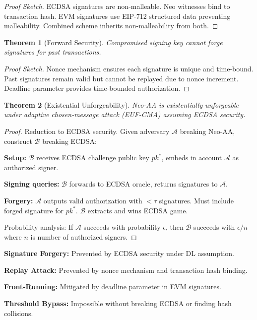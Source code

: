 \documentclass[10pt,twocolumn]{article}
\newtheorem{theorem}{Theorem}
\begin{document}
\begin{proof}[Proof Sketch]
ECDSA signatures are non-malleable. Neo witnesses bind to transaction hash. EVM signatures use EIP-712 structured data preventing malleability. Combined scheme inherits non-malleability from both.
\end{proof}

\begin{theorem}[Forward Security]
Compromised signing key cannot forge signatures for past transactions.
\end{theorem}

\begin{proof}[Proof Sketch]
Nonce mechanism ensures each signature is unique and time-bound. Past signatures remain valid but cannot be replayed due to nonce increment. Deadline parameter provides time-bounded authorization.
\end{proof}


\begin{theorem}[Existential Unforgeability]
Neo-AA is existentially unforgeable under adaptive chosen-message attack (EUF-CMA) assuming ECDSA security.
\end{theorem}

\begin{proof}
Reduction to ECDSA security. Given adversary $\mathcal{A}$ breaking Neo-AA, construct $\mathcal{B}$ breaking ECDSA:

\textbf{Setup:} $\mathcal{B}$ receives ECDSA challenge public key $pk^*$, embeds in account $\mathcal{A}$ as authorized signer.

\textbf{Signing queries:} $\mathcal{B}$ forwards to ECDSA oracle, returns signatures to $\mathcal{A}$.

\textbf{Forgery:} $\mathcal{A}$ outputs valid authorization with $< \tau$ signatures. Must include forged signature for $pk^*$. $\mathcal{B}$ extracts and wins ECDSA game.

Probability analysis: If $\mathcal{A}$ succeeds with probability $\epsilon$, then $\mathcal{B}$ succeeds with $\epsilon/n$ where $n$ is number of authorized signers.
\end{proof}


\textbf{Signature Forgery:} Prevented by ECDSA security under DL assumption.

\textbf{Replay Attack:} Prevented by nonce mechanism and transaction hash binding.

\textbf{Front-Running:} Mitigated by deadline parameter in EVM signatures.

\textbf{Threshold Bypass:} Impossible without breaking ECDSA or finding hash collisions.
\end{document}
